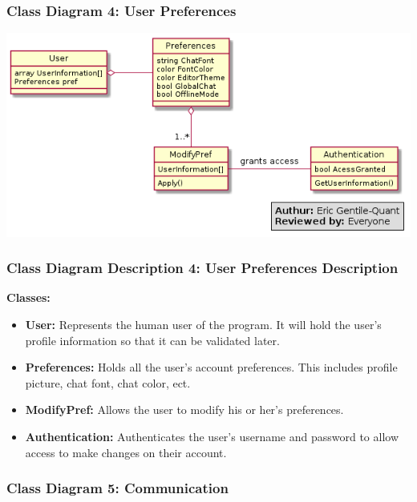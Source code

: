 \documentclass[twoside,letterpaper]{article}
\begin{document}
	\newpage
	
	\subsubsection[Class Diagram 4: User Preferences]{\rmfamily\bfseries\color{black}
		Class Diagram 4: User Preferences}
	\hypertarget{RefHeading22059017292}{}
	\bigskip
	
	\includegraphics[width=6.0in]{images/ClassDiagrams/UserPref}
	
	\newpage
	
	\subsubsection[Class Diagram Description 4: User Preferences Description]{\rmfamily\bfseries\color{black}
		Class Diagram Description 4: User Preferences Description}
	\hypertarget{RefHeading22059017292}{}
	
	\textbf{Classes:}
	\begin{itemize}
	
	       \item \textbf{User:} Represents the human user of the program. It will hold the user's profile information so that it can be validated later.
	       \item \textbf{Preferences:} Holds all the user's account preferences. This includes profile picture, chat font, chat color, ect.
	       \item \textbf{ModifyPref:} Allows the user to modify his or her's preferences.
	       \item \textbf{Authentication:} Authenticates the user's username and password to allow access to make changes on their account.
	\end{itemize}
	
	\newpage
	\subsubsection[Class Diagram 5: Communication]{\rmfamily\bfseries\color{black}
		Class Diagram 5: Communication}
	\hypertarget{RefHeading22059017292}{}
	\bigskip
	
\end{document}
